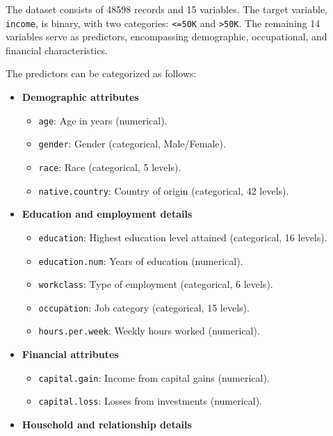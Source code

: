 \documentclass[
  11pt,
]{book}
\newcommand{\passthrough}[1]{#1}
\providecommand{\tightlist}{%
  \setlength{\itemsep}{0pt}\setlength{\parskip}{0pt}}
\theoremstyle{definition}
\theoremstyle{definition}
\theoremstyle{definition}
\theoremstyle{definition}
\theoremstyle{remark}
\begin{document}
The dataset consists of 48598 records and 15 variables. The target variable, \passthrough{\lstinline!income!}, is binary, with two categories: \passthrough{\lstinline!<=50K!} and \passthrough{\lstinline!>50K!}. The remaining 14 variables serve as predictors, encompassing demographic, occupational, and financial characteristics.

The predictors can be categorized as follows:

\begin{itemize}
\tightlist
\item
  \textbf{Demographic attributes}

  \begin{itemize}
  \tightlist
  \item
    \passthrough{\lstinline!age!}: Age in years (numerical).\\
  \item
    \passthrough{\lstinline!gender!}: Gender (categorical, Male/Female).\\
  \item
    \passthrough{\lstinline!race!}: Race (categorical, 5 levels).\\
  \item
    \passthrough{\lstinline!native.country!}: Country of origin (categorical, 42 levels).
  \end{itemize}
\item
  \textbf{Education and employment details}

  \begin{itemize}
  \tightlist
  \item
    \passthrough{\lstinline!education!}: Highest education level attained (categorical, 16 levels).\\
  \item
    \passthrough{\lstinline!education.num!}: Years of education (numerical).\\
  \item
    \passthrough{\lstinline!workclass!}: Type of employment (categorical, 6 levels).\\
  \item
    \passthrough{\lstinline!occupation!}: Job category (categorical, 15 levels).\\
  \item
    \passthrough{\lstinline!hours.per.week!}: Weekly hours worked (numerical).
  \end{itemize}
\item
  \textbf{Financial attributes}

  \begin{itemize}
  \tightlist
  \item
    \passthrough{\lstinline!capital.gain!}: Income from capital gains (numerical).\\
  \item
    \passthrough{\lstinline!capital.loss!}: Losses from investments (numerical).
  \end{itemize}
\item
  \textbf{Household and relationship details}


\end{itemize}
\end{document}
